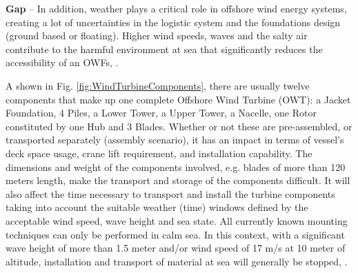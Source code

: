 \textbf{Gap} --
In addition, weather plays a critical role in offshore wind energy systems, creating a lot of uncertainties in the logistic system and the foundations design (ground based or floating). Higher wind speeds, waves and the salty air contribute to the harmful environment at sea that significantly reduces the accessibility of an OWFs, \cite{Smit_2007, Walker_2013}.

A shown in Fig. \ref{fig:WindTurbineComponents}, there are usually twelve components that make up one complete Offshore Wind Turbine (OWT): a Jacket Foundation, 4 Piles, a Lower Tower, a Upper Tower, a Nacelle, one Rotor constituted by one Hub and 3 Blades. Whether or not these are pre-assembled, or transported separately (assembly scenario), it has an impact in terms of vessel’s deck space usage, crane lift requirement, and installation capability. The dimensions and weight of the components involved, e.g. blades of more than 120 meters length, make the transport and storage of the components difficult. It will also affect the time necessary to transport and install the turbine components taking into account the suitable weather (time) windows defined by the acceptable wind speed, wave height and sea state. All currently known mounting techniques can only be performed in calm sea. In this context, with a significant wave height of more than 1.5 meter and/or wind speed of 17 m/s at 10 meter of altitude, installation and transport of material at sea will generally be stopped, \cite{aitsimulation}.
